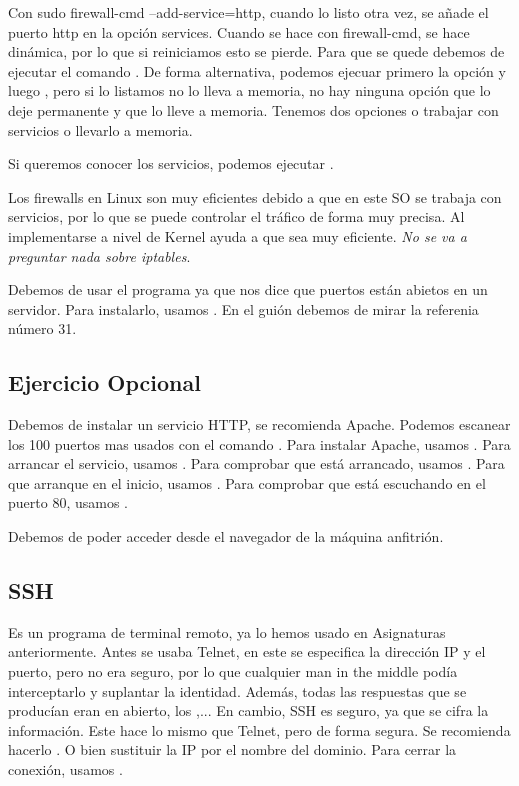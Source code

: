 Con sudo firewall-cmd --add-service=http, cuando lo listo otra vez, se añade el puerto http en la opción services. Cuando se hace con firewall-cmd, se hace dinámica, por lo que si reiniciamos esto se pierde. Para que se quede debemos de ejecutar el comando . De forma alternativa, podemos ejecuar primero la opción  y luego , pero si lo listamos no lo lleva a memoria, no hay ninguna opción que lo deje permanente y que lo lleve a memoria. Tenemos dos opciones o trabajar con servicios o llevarlo a memoria.

Si queremos conocer los servicios, podemos ejecutar .

Los firewalls en Linux son muy eficientes debido a que en este SO se trabaja con servicios, por lo que se puede controlar el tráfico de forma muy precisa. Al implementarse a nivel de Kernel ayuda a que sea muy eficiente.
\textit{No se va a preguntar nada sobre iptables}.

Debemos de usar el programa  ya que nos dice que puertos están abietos en un servidor. Para instalarlo, usamos . En el guión debemos de mirar la referenia número 31.

\subsection{Ejercicio Opcional}

Debemos de instalar un servicio HTTP, se recomienda Apache. Podemos escanear los 100 puertos mas usados con el comando . Para instalar Apache, usamos . Para arrancar el servicio, usamos . Para comprobar que está arrancado, usamos . Para que arranque en el inicio, usamos . Para comprobar que está escuchando en el puerto 80, usamos .

Debemos de poder acceder desde el navegador de la máquina anfitrión.

\subsection{SSH}

Es un programa de terminal remoto, ya lo hemos usado en Asignaturas anteriormente. Antes se usaba Telnet, en este se especifica la dirección IP y el puerto, pero no era seguro, por lo que cualquier man in the middle podía interceptarlo y suplantar la identidad. Además, todas las respuestas que se producían eran en abierto, los ,... En cambio, SSH es seguro, ya que se cifra la información. Este hace lo mismo que Telnet, pero de forma segura. Se recomienda hacerlo . O bien sustituir la IP por el nombre del dominio. Para cerrar la conexión, usamos . 

